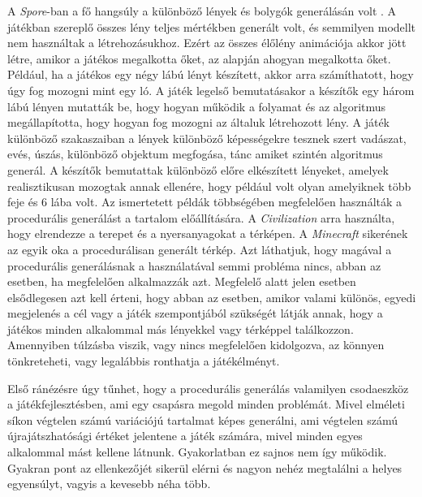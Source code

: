 A \textit{Spore}-ban a fő hangsúly a különböző lények és bolygók generálásán volt \cite{Spore}. A játékban szereplő összes lény teljes mértékben generált volt, és semmilyen modellt nem használtak a létrehozásukhoz. Ezért az összes élőlény animációja akkor jött létre, amikor a játékos megalkotta őket, az alapján ahogyan megalkotta őket. Például, ha a játékos egy négy lábú lényt készített, akkor arra számíthatott, hogy úgy fog mozogni mint egy ló. A játék legelső bemutatásakor a készítők egy három lábú lényen mutatták be, hogy hogyan működik a folyamat és az algoritmus megállapította, hogy hogyan fog mozogni az általuk létrehozott lény. A játék különböző szakaszaiban a lények különböző képességekre tesznek szert vadászat, evés, úszás, különböző objektum megfogása, tánc amiket szintén algoritmus generál. A készítők bemutattak különböző előre elkészített lényeket, amelyek realisztikusan mozogtak annak ellenére, hogy például volt olyan amelyiknek több feje és 6 lába volt.
\newpage
Az ismertetett példák többségében megfelelően használták a procedurális generálást a tartalom előállítására. A \textit{Civilization} arra használta, hogy elrendezze a terepet és a nyersanyagokat a térképen. A \textit{Minecraft} sikerének az egyik oka a procedurálisan generált térkép. Azt láthatjuk, hogy magával a procedurális generálásnak a használatával semmi probléma nincs, abban az esetben, ha megfelelően alkalmazzák azt. Megfelelő alatt jelen esetben elsődlegesen azt kell érteni, hogy abban az esetben, amikor valami különös, egyedi megjelenés a cél vagy a játék szempontjából szükségét látják annak, hogy a játékos minden alkalommal más lényekkel vagy térképpel találkozzon. Amennyiben túlzásba viszik, vagy nincs megfelelően kidolgozva, az könnyen tönkreteheti, vagy legalábbis ronthatja a játékélményt.

Első ránézésre úgy tűnhet, hogy a procedurális generálás valamilyen csodaeszköz a játékfejlesztésben, ami egy csapásra megold minden problémát. Mivel elméleti síkon végtelen számú variációjú tartalmat képes generálni, ami végtelen számú újrajátszhatósági értéket jelentene a játék számára, mivel minden egyes alkalommal mást kellene látnunk. Gyakorlatban ez sajnos nem így működik. Gyakran pont az ellenkezőjét sikerül elérni és nagyon nehéz megtalálni a helyes egyensúlyt, vagyis a kevesebb néha több.


